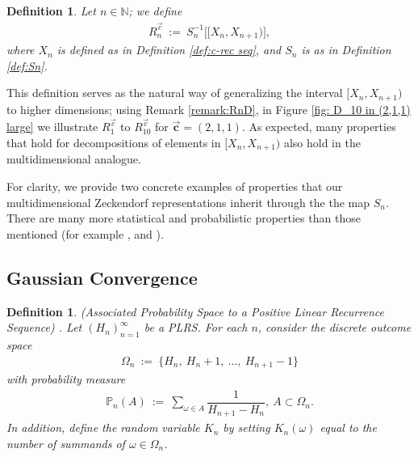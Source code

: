 \documentclass[]{interact}
\newcommand{\N}{{\mathbb N}}  %
\newcommand{\vtr}[1]{\vec{\mathbf{#1}}}
\theoremstyle{plain}
\numberwithin{equation}{section} %
\newtheorem{definition}[thm]{Definition}
\numberwithin{table}{section} %
\numberwithin{figure}{section}
\begin{document}
\begin{definition} \label{def: Rn}
    Let $n\in \N$; we define 
    \begin{align*}   
        R_n^{\vec{c}} \ :=\ S_n^{-1}\Big[ [X_n, X_{n+1}) \Big], 
    \end{align*}
    where $X_n$ is defined as in Definition \textcolor{blue}{\ref{def:c-rec seq}}, and $S_n$ is as in Definition \textcolor{blue}{\ref{def:Sn}}.
\end{definition}
This definition serves as the natural way of generalizing the interval $[X_n, X_{n+1})$ to higher dimensions; using Remark \textcolor{blue}{\ref{remark:RnD}}, in Figure \textcolor{blue}{\ref{fig: D_10 in (2,1,1) large}} we illustrate $R_{1}^{\vec{c}}$ to $R_{10}^{\vec{c}}$ for  $\vtr{c}=(2,1,1)$. As expected, many properties that hold for decompositions of elements in $[X_n, X_{n+1})$ also hold in the multidimensional analogue. 

For clarity, we provide two concrete examples of properties that our multidimensional Zeckendorf representations inherit through the the map $S_n$. There are many more statistical and probabilistic properties than those mentioned (for example \textcolor{blue}{\cite{BILMTB-A15}}, \textcolor{blue}{\cite{BILMT13}} and \textcolor{blue}{\cite{BBGILMT13}}).

\subsection{Gaussian Convergence}

\begin{definition} (Associated Probability Space to a Positive Linear Recurrence Sequence) \textcolor{blue}{\cite{MW12}}. Let $(H_n)_{n=1}^\infty$ be a PLRS. For each $n$, consider the discrete outcome space
\begin{align*}
    \Omega_n \ := \ \{H_n,\ H_n+1, \ \ldots, \ H_{n+1}-1 \}
\end{align*}
with probability measure
\begin{align*}
    \mathbb{P}_n(A) \ := \ \sum_{\omega \in A} \dfrac{1}{H_{n+1} - H_n}, \ A\subset \Omega_n.
\end{align*}
In addition, define the random variable $K_n$ by setting $K_n(\omega)$ equal to the number of summands of $\omega \in \Omega_n$.
\end{definition}
\end{document}
